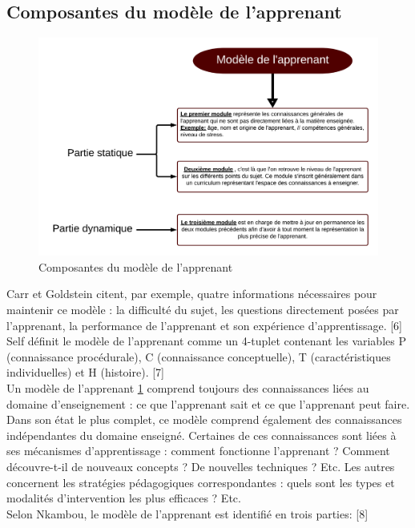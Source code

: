 \subsection{Composantes du modèle de l'apprenant}
\begin{figure}[H]
	\begin{center}
		\includegraphics[width=\textwidth]{images/chapitre2/Learner_model.png}
	\end{center}
\caption{Composantes du modèle de l'apprenant}
\label{learnerModel}
\end{figure}
Carr et Goldstein citent, par exemple, quatre informations nécessaires pour maintenir ce modèle : la difficulté du sujet, les questions directement posées par l’apprenant, la performance de l’apprenant et son expérience d’apprentissage. [6] Self définit le modèle de l'apprenant comme un 4-tuplet contenant les variables P (connaissance procédurale), C (connaissance conceptuelle), T (caractéristiques individuelles) et H (histoire). [7] \\
Un modèle de l'apprenant \ref{learnerModel} comprend toujours des connaissances liées au domaine d'enseignement : ce que l'apprenant sait et ce que l'apprenant peut faire. Dans son état le plus complet, ce modèle comprend également des connaissances indépendantes du domaine enseigné. Certaines de ces connaissances sont liées à ses mécanismes d'apprentissage : comment fonctionne l'apprenant ? Comment découvre-t-il de nouveaux concepts ? De nouvelles techniques ? Etc. Les autres concernent les stratégies pédagogiques correspondantes : quels sont les types et modalités d'intervention les plus efficaces ? Etc. \\
Selon Nkambou, le modèle de l'apprenant est identifié en trois parties: [8]

